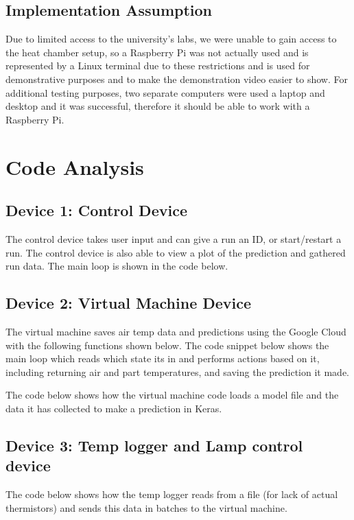 \documentclass{article}
\begin{document}
\subsection{Implementation Assumption}
Due to limited access to the university's labs, we were unable to gain access to the heat chamber setup, so a Raspberry Pi was not actually used and is represented by a Linux terminal due to these restrictions and is used for demonstrative purposes and to make the demonstration video easier to show. For additional testing purposes, two separate computers were used a laptop and desktop and it was successful, therefore it should be able to work with a Raspberry Pi. 

\section{Code Analysis}

\subsection{Device 1: Control Device}
The control device takes user input and can give a run an ID, or start/restart a run. The control device is also able to view a plot of the prediction and gathered run data. The main loop is shown in the code below.


\subsection{Device 2: Virtual Machine Device}
The virtual machine saves air temp data and predictions using the Google Cloud with the following functions shown below. The code snippet below shows the main loop which reads which state its in and performs actions based on it, including returning air and part temperatures, and saving the prediction it made.

The code below shows how the virtual machine code loads a model file and the data it has collected to make a prediction in Keras.
 

\subsection{Device 3: Temp logger and Lamp control device}
The code below shows how the temp logger reads from a file (for lack of actual thermistors) and sends this data in batches to the virtual machine.

\end{document}
